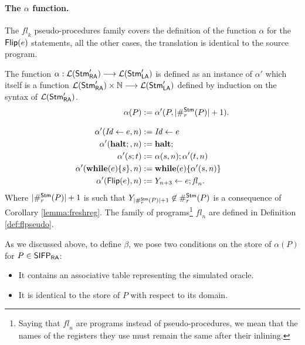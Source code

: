 \paragraph*{The $\alpha$ function.}

The $\mathit{fl}_k$ pseudo-procedures family covers the definition of the function
$\alpha$ for the $\mathsf{Flip(}e\mathsf{)}$ statements, all the other cases, the translation
is identical to the source program.

\begin{defn}
  \label{def:alpha}
  The function $\alpha: {\mathcal L ({\mathsf{Stm}_{\mathsf{RA}}'})}
    \longrightarrow
    {\mathcal L ({\mathsf{Stm}_{\mathsf{LA}}'})}$ is defined as an instance of $\alpha'$ which itself is a
    function
    ${\mathcal L ({\mathsf{Stm}_{\mathsf{RA}}'})}\times \mathbb{N}
      \longrightarrow
      {\mathcal L ({\mathsf{Stm}_{\mathsf{LA}}'})}$ defined by
     induction on the syntax of ${\mathcal L ({\mathsf{Stm}_{\mathsf{RA}}'})}$.
  \begin{align*}
    \alpha(P)&:=\alpha'(P, |\#_r^{\mathsf{Stm}}(P)|+1).\\[2ex]
    \alpha'(\mathit{Id} \leftarrow e, n) &:= \mathit{Id} \leftarrow e\\
    \alpha'(\mathbf{halt};, n) &:= \mathbf{halt};\\
    \alpha'(s;t) &:= \alpha(s, n);\alpha'(t, n)\\
    \alpha'(\mathbf{while}(e)\{s\}, n) &:= \mathbf{while}(e)\{\alpha'(s, n)\}\\
    \alpha'(\mathsf{Flip(}e\mathsf{)}, n) &:=  Y_{n+3}\leftarrow e; \mathit{fl}_n.
  \end{align*}
  Where $|\#_r^{\mathsf{Stm}}(P)|+1$ is such that $Y_{|\#_r^{\mathsf{Stm}}(P)|+1} \not \in \#_r^{\mathsf{Stm}}(P)$
  is a consequence of Corollary \ref{lemma:freshreg}.
  The family of programs\footnote{Saying that $\mathit{fl}_n$ are programs instead of pseudo-procedures, we mean that the names of the registers they use must remain the same after their inlining.} $\mathit{fl}_n$ are defined in Definition
  \ref{def:flpseudo}.
\end{defn}

As we discussed above, to define $\beta$, we pose two conditions on the store of
$\alpha(P)$ for $P \in\mathsf{SIFP_{{\mathsf{RA}}}}$:
\begin{itemize}
  \item It contains an associative table representing the simulated oracle.
  \item It is identical to the store of $P$ with respect to its domain.
\end{itemize}


